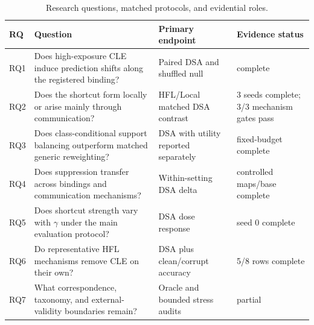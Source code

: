 \begin{table}[t]
\centering
\small
\caption{Research questions, matched protocols, and evidential roles.}
\label{tab:research-questions}
\begin{tabularx}{\textwidth}{lXll}
\toprule
RQ & Question & Primary endpoint & Evidence status \\
\midrule
RQ1 & Does high-exposure CLE induce prediction shifts along the registered binding? & Paired DSA and shuffled null & complete \\
RQ2 & Does the shortcut form locally or arise mainly through communication? & HFL/Local matched DSA contrast & 3 seeds complete; 3/3 mechanism gates pass \\
RQ3 & Does class-conditional support balancing outperform matched generic reweighting? & DSA with utility reported separately & fixed-budget complete \\
RQ4 & Does suppression transfer across bindings and communication mechanisms? & Within-setting DSA delta & controlled maps/base complete \\
RQ5 & Does shortcut strength vary with \(\gamma\) under the main evaluation protocol? & DSA dose response & seed 0 complete \\
RQ6 & Do representative HFL mechanisms remove CLE on their own? & DSA plus clean/corrupt accuracy & 5/8 rows complete \\
RQ7 & What correspondence, taxonomy, and external-validity boundaries remain? & Oracle and bounded stress audits & partial \\
\bottomrule
\end{tabularx}
\end{table}
